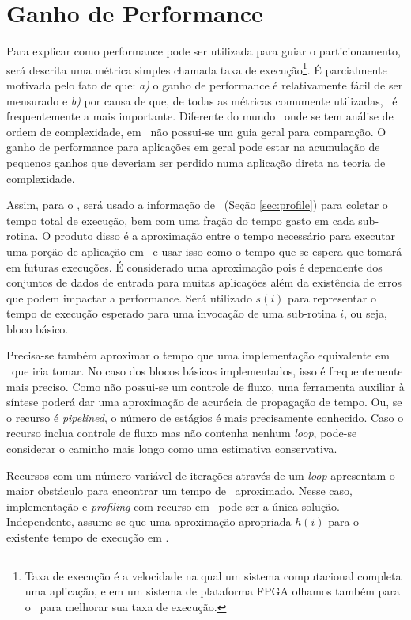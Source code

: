    \section{Ganho de Performance} \label{sec:ganho_performance}
      Para explicar como performance pode ser utilizada para guiar o particionamento, será descrita uma métrica simples chamada taxa de execução\footnote{Taxa de execução é a velocidade na qual um sistema computacional completa uma aplicação, e em um sistema de plataforma FPGA olhamos também para o \hardware\ para melhorar sua taxa de execução.}.
      É parcialmente motivada pelo fato de que: \textit{a)} o ganho de performance é relativamente fácil de ser mensurado e \textit{b)} por causa de que, de todas as métricas comumente utilizadas, \speedup\ é frequentemente a mais importante.
      Diferente do mundo \software\ onde se tem análise de ordem de complexidade, em \hardware\ não possui-se um guia geral para comparação.
      O ganho de performance para aplicações em geral pode estar na acumulação de pequenos ganhos que deveriam ser perdido numa aplicação direta na teoria de complexidade.

      Assim, para o \software, será usado a informação de \profile\ (Seção \ref{sec:profile}) para coletar o tempo total de execução, bem com uma fração do tempo gasto em cada sub-rotina.
      O produto disso é a aproximação entre o tempo necessário para executar uma porção de aplicação em \software\ e usar isso como o tempo que se espera que tomará em futuras execuções.
      É considerado uma aproximação pois é dependente dos conjuntos de dados de entrada para muitas aplicações além da existência de erros que podem impactar a performance.
      Será utilizado $ s(i) $ para representar o tempo de execução esperado para uma invocação de uma sub-rotina $ i $, ou seja, bloco básico.

      Precisa-se também aproximar o tempo que uma implementação equivalente em \hardware\ que iria tomar.
      No caso dos blocos básicos implementados, isso é frequentemente mais preciso.
      Como não possui-se um controle de fluxo, uma ferramenta auxiliar à síntese poderá dar uma aproximação de acurácia de propagação de tempo.
      Ou, se o recurso é \textit{pipelined}, o número de estágios é mais precisamente conhecido.
      Caso o recurso inclua controle de fluxo mas não contenha nenhum \textit{loop}, pode-se considerar o caminho mais longo como uma estimativa conservativa.

      Recursos com um número variável de iterações através de um \textit{loop} apresentam o maior obstáculo para encontrar um tempo de \hardware\ aproximado.
      Nesse caso, implementação e \textit{profiling} com recurso em \hardware\ pode ser a única solução.
      Independente, assume-se que uma aproximação apropriada $ h(i) $ para o existente tempo de execução em \hardware.

